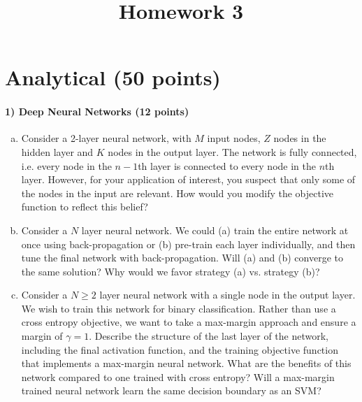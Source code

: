 \documentclass{article}
\begin{document}
\title{Homework 3}
\maketitle
\thispagestyle{fancy}


\section{Analytical (50 points)}

\paragraph{1) Deep Neural Networks (12 points)}

\begin{enumerate}[(a)]
	\item Consider a 2-layer neural network, with $M$ input nodes, $Z$ nodes in the hidden layer and $K$ nodes in the output layer. The network is fully connected, i.e. every node in the $n-1$th layer is connected to every node in the $n$th layer. However, for your application of interest, you suspect that only some of the nodes in the input are relevant. How would you modify the objective function to reflect this belief?

	\item Consider a $N$ layer neural network. We could (a) train the entire network at once using back-propagation or (b) pre-train each layer individually, and then tune the final network with back-propagation. Will (a) and (b) converge to the same solution? Why would we favor strategy (a) vs. strategy (b)?

	\item Consider a $N\ge2$ layer neural network with a single node in the output layer. We wish to train this network for binary classification. Rather than use a cross entropy objective, we want to take a max-margin approach and ensure a margin of $\gamma=1$. Describe the structure of the last layer of the network, including the final activation function, and the training objective function that implements a max-margin neural network. What are the benefits of this network compared to one trained with cross entropy? Will a max-margin trained neural network learn the same decision boundary as an SVM?


\end{enumerate}
\end{document}
